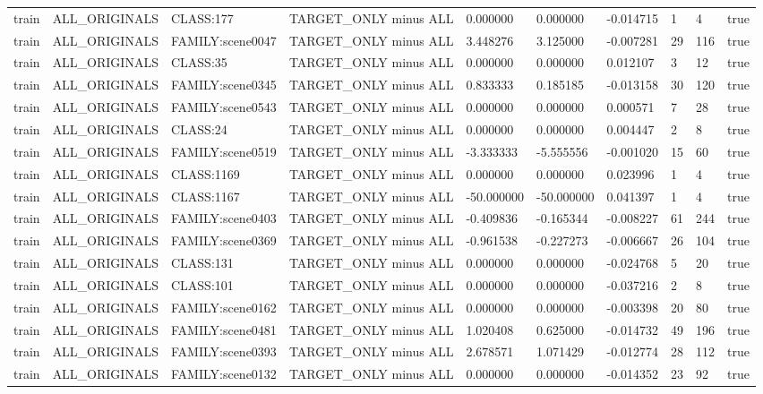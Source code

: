 \begin{tabular}{llllllllll}
train & ALL\_ORIGINALS & CLASS:177 & TARGET\_ONLY minus ALL & 0.000000 & 0.000000 & -0.014715 & 1 & 4 & true \\
train & ALL\_ORIGINALS & FAMILY:scene0047 & TARGET\_ONLY minus ALL & 3.448276 & 3.125000 & -0.007281 & 29 & 116 & true \\
train & ALL\_ORIGINALS & CLASS:35 & TARGET\_ONLY minus ALL & 0.000000 & 0.000000 & 0.012107 & 3 & 12 & true \\
train & ALL\_ORIGINALS & FAMILY:scene0345 & TARGET\_ONLY minus ALL & 0.833333 & 0.185185 & -0.013158 & 30 & 120 & true \\
train & ALL\_ORIGINALS & FAMILY:scene0543 & TARGET\_ONLY minus ALL & 0.000000 & 0.000000 & 0.000571 & 7 & 28 & true \\
train & ALL\_ORIGINALS & CLASS:24 & TARGET\_ONLY minus ALL & 0.000000 & 0.000000 & 0.004447 & 2 & 8 & true \\
train & ALL\_ORIGINALS & FAMILY:scene0519 & TARGET\_ONLY minus ALL & -3.333333 & -5.555556 & -0.001020 & 15 & 60 & true \\
train & ALL\_ORIGINALS & CLASS:1169 & TARGET\_ONLY minus ALL & 0.000000 & 0.000000 & 0.023996 & 1 & 4 & true \\
train & ALL\_ORIGINALS & CLASS:1167 & TARGET\_ONLY minus ALL & -50.000000 & -50.000000 & 0.041397 & 1 & 4 & true \\
train & ALL\_ORIGINALS & FAMILY:scene0403 & TARGET\_ONLY minus ALL & -0.409836 & -0.165344 & -0.008227 & 61 & 244 & true \\
train & ALL\_ORIGINALS & FAMILY:scene0369 & TARGET\_ONLY minus ALL & -0.961538 & -0.227273 & -0.006667 & 26 & 104 & true \\
train & ALL\_ORIGINALS & CLASS:131 & TARGET\_ONLY minus ALL & 0.000000 & 0.000000 & -0.024768 & 5 & 20 & true \\
train & ALL\_ORIGINALS & CLASS:101 & TARGET\_ONLY minus ALL & 0.000000 & 0.000000 & -0.037216 & 2 & 8 & true \\
train & ALL\_ORIGINALS & FAMILY:scene0162 & TARGET\_ONLY minus ALL & 0.000000 & 0.000000 & -0.003398 & 20 & 80 & true \\
train & ALL\_ORIGINALS & FAMILY:scene0481 & TARGET\_ONLY minus ALL & 1.020408 & 0.625000 & -0.014732 & 49 & 196 & true \\
train & ALL\_ORIGINALS & FAMILY:scene0393 & TARGET\_ONLY minus ALL & 2.678571 & 1.071429 & -0.012774 & 28 & 112 & true \\
train & ALL\_ORIGINALS & FAMILY:scene0132 & TARGET\_ONLY minus ALL & 0.000000 & 0.000000 & -0.014352 & 23 & 92 & true \\

\end{tabular}
